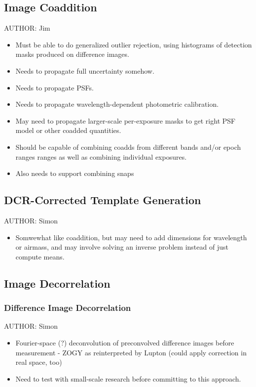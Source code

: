 \subsection{Image Coaddition}
\label{sec:acCoaddition}
AUTHOR: Jim
\begin{itemize}
\item Must be able to do generalized outlier rejection, using histograms of detection masks produced on difference images.
\item Needs to propagate full uncertainty somehow.
\item Needs to propagate PSFs.
\item Needs to propagate wavelength-dependent photometric calibration.
\item May need to propagate larger-scale per-exposure masks to get right PSF model or other coadded quantities.
\item Should be capable of combining coadds from different bands and/or epoch ranges ranges as well as combining individual exposures.
\item Also needs to support combining snaps
\end{itemize}

\subsection{DCR-Corrected Template Generation}
\label{sec:acDCRTemplates}
AUTHOR: Simon
\begin{itemize}
\item Somwewhat like coaddition, but may need to add dimensions for wavelength or airmass, and may involve solving an inverse problem instead of just compute means.
\end{itemize}

\subsection{Image Decorrelation}
\label{sec:acImageDecorrelation}
\subsubsection{Difference Image Decorrelation}
\label{sec:acDiffImDecorrelation}
AUTHOR: Simon
\begin{itemize}
\item Fourier-space (?) deconvolution of preconvolved difference images before measurement - ZOGY as reinterpreted by Lupton (could apply correction in real space, too)
\item Need to test with small-scale research before committing to this approach.
\end{itemize}

